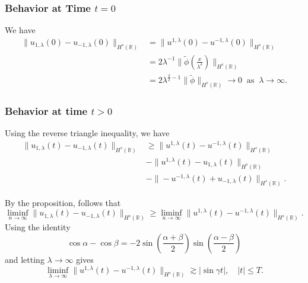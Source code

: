 \documentclass{beamer}
\newcommand{\rr}{\mathbb{R}}
\begin{document}
\begin{frame}
	\frametitle{Behavior at Time $t=0$}  We have
%
%
%
%
\begin{equation*}
\begin{split}
\|u_{1,\lambda}(0) - u_{-1,\lambda}(0) \|_{H^s(\rr)} & = \|u^{1,\lambda}(0) 
- u^{-1,\lambda}(0) \|_{H^s(\rr)}
\\
& = 2 \lambda^{-1} \| \tilde{\phi}\left( \frac{x}{\lambda^\delta} \right) 
\|_{H^s(\rr)}
\\
& = 2
\lambda^{\frac{\delta}{2}-1} \|\tilde{\phi} \|_{H^s(\rr)} \to 0
\; \; \text{as} \; \; \lambda \to \infty.
\end{split}
\end{equation*}


\end{frame}
%
%

\begin{frame}
	\frametitle{Behavior at time  $t>0$}
%
%
%  
%

Using the reverse triangle inequality, we 
have
%
%
%
%
%
\begin{equation*} \label{appleHR-slns-differ-t-pos}
\begin{split}
\|
u_{1,\lambda}(t)
-
u_{- 1,\lambda}(t)
\|_{H^s(\rr)}
&
\ge
\|
u^{1,\lambda}(t)
-
u^{- 1,\lambda}(t)
\|_{H^s(\rr)}
\\
& -
\|
u^{1,\lambda}(t)
-
u_{1,\lambda}(t)
\|_{H^s(\rr)}
\\
& -
\|
-u^{-1,\lambda}(t)
+
u_{-1,\lambda}(t)
\|_{H^s(\rr)}.
\end{split}
\end{equation*}
%
%
%
\end{frame}
\begin{frame}
%
By the proposition, follows that
%
%
%
%
%
%
%
\begin{equation*} \label{appleHR-slns-to-ap-est}
\liminf_{n\to\infty}
\|
u_{1,\lambda}(t)
-
u_{- 1,\lambda}(t)
\|_{H^s(\rr)}
\ge
\liminf_{n\to\infty}
\|
u^{1,\lambda}(t)
-
u^{- 1,\lambda}(t)
\|_{H^s(\rr)}.
\end{equation*}
%
%
%
%
\pause
Using the identity $$
\cos \alpha -\cos \beta
=
-2
\sin(\frac{\alpha + \beta}{2})
\sin(\frac{\alpha - \beta}{2})
$$
and letting $\lambda \to \infty$
gives
%
%
%
%
%
%
\begin{equation*} \label{apple91}
\liminf_{\lambda \to\infty}
\|
u^{1,\lambda}(t)
-
u^{- 1,\lambda}(t)
\|_{H^s(\rr)}
\gtrsim
|\sin \gamma t|, \quad |t| \le T.
\end{equation*}
%
%
\end{frame}
\end{document}
